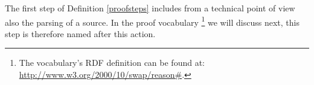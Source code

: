 The first step of Definition \ref{proofsteps} includes from a technical point of view also the parsing of a source.
In the \nthree proof vocabulary%
\footnote{The vocabulary's RDF definition can be found at: \url{http://www.w3.org/2000/10/swap/reason\#}.}
we will discuss next,
this step is therefore named after this action.

